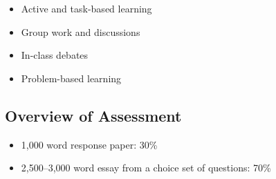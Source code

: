 \documentclass[abstract=on,parskip=full,headings=standardclasses,fontsize=11pt,paper=a4]{scrartcl}
\begin{document}
\begin{itemize}
\item Active and task-based learning
\item Group work and discussions
\item In-class debates
\item Problem-based learning
\end{itemize}






\subsection*{Overview of Assessment}

\begin{itemize}
\item 1,000 word response paper: 30\% 
\item 2,500--3,000 word essay from a choice set of questions: 70\%
\end{itemize}
\end{document}
